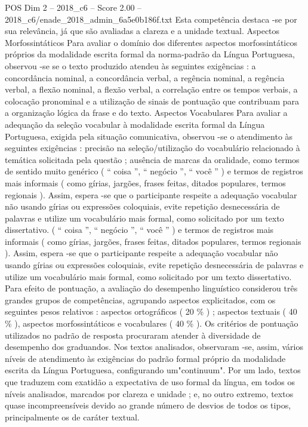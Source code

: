 \begin{textsample}{POS Dim 2 – 2018\_c6 – Score 2.00 – 2018\_c6/enade\_2018\_admin\_6a5e0b186f.txt}
Esta competência destaca -se por sua relevância, já que são avaliadas a clareza e a unidade textual.
Aspectos Morfossintáticos Para avaliar o domínio dos diferentes aspectos morfossintáticos próprios da modalidade escrita formal da norma-padrão da Língua Portuguesa, observou -se se o texto produzido atendeu às seguintes exigências : a concordância nominal, a concordância verbal, a regência nominal, a regência verbal, a flexão nominal, a flexão verbal, a correlação entre os tempos verbais, a colocação pronominal e a utilização de sinais de pontuação que contribuam para a organização lógica da frase e do texto.
Aspectos Vocabulares Para avaliar a adequação da seleção vocabular à modalidade escrita formal da Língua Portuguesa, exigida pela situação comunicativa, observou -se o atendimento às seguintes exigências : precisão na seleção/utilização do vocabulário relacionado à temática solicitada pela questão ; ausência de marcas da oralidade, como termos de sentido muito genérico ( “ coisa ”, “ negócio ”, “ você ” ) e termos de registros mais informais ( como gírias, jargões, frases feitas, ditados populares, termos regionais ).
Assim, espera -se que o participante respeite a adequação vocabular não usando gírias ou expressões coloquiais, evite repetição desnecessária de palavras e utilize um vocabulário mais formal, como solicitado por um texto dissertativo. ( “ coisa ”, “ negócio ”, “ você ” ) e termos de registros mais informais ( como gírias, jargões, frases feitas, ditados populares, termos regionais ).
Assim, espera -se que o participante respeite a adequação vocabular não usando gírias ou expressões coloquiais, evite repetição desnecessária de palavras e utilize um vocabulário mais formal, como solicitado por um texto dissertativo.
Para efeito de pontuação, a avaliação do desempenho linguístico considerou três grandes grupos de competências, agrupando aspectos explicitados, com os seguintes pesos relativos : aspectos ortográficos ( 20 \% ) ; aspectos textuais ( 40 \% ), aspectos morfossintáticos e vocabulares ( 40 \% ).
Os critérios de pontuação utilizados no padrão de resposta procuraram atender à diversidade de desempenho dos graduandos.
Nos textos analisados, observaram -se, assim, vários níveis de atendimento às exigências do padrão formal próprio da modalidade escrita da Língua Portuguesa, configurando um"continuum".
Por um lado, textos que traduzem com exatidão a expectativa de uso formal da língua, em todos os níveis analisados, marcados por clareza e unidade ; e, no outro extremo, textos quase incompreensíveis devido ao grande número de desvios de todos os tipos, principalmente os de caráter textual.

\end{textsample}

